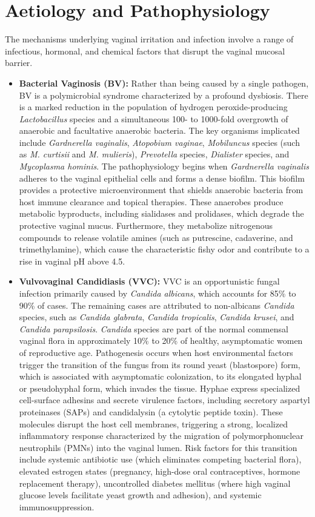\section*{Aetiology and Pathophysiology}
The mechanisms underlying vaginal irritation and infection involve a range of infectious, hormonal, and chemical factors that disrupt the vaginal mucosal barrier.
\begin{itemize}
    \item \textbf{Bacterial Vaginosis (BV):} Rather than being caused by a single pathogen, BV is a polymicrobial syndrome characterized by a profound dysbiosis. There is a marked reduction in the population of hydrogen peroxide-producing \textit{Lactobacillus} species and a simultaneous 100- to 1000-fold overgrowth of anaerobic and facultative anaerobic bacteria. The key organisms implicated include \textit{Gardnerella vaginalis}, \textit{Atopobium vaginae}, \textit{Mobiluncus} species (such as \textit{M. curtisii} and \textit{M. mulieris}), \textit{Prevotella} species, \textit{Dialister} species, and \textit{Mycoplasma hominis}. The pathophysiology begins when \textit{Gardnerella vaginalis} adheres to the vaginal epithelial cells and forms a dense biofilm. This biofilm provides a protective microenvironment that shields anaerobic bacteria from host immune clearance and topical therapies. These anaerobes produce metabolic byproducts, including sialidases and prolidases, which degrade the protective vaginal mucus. Furthermore, they metabolize nitrogenous compounds to release volatile amines (such as putrescine, cadaverine, and trimethylamine), which cause the characteristic fishy odor and contribute to a rise in vaginal pH above 4.5.
    \item \textbf{Vulvovaginal Candidiasis (VVC):} VVC is an opportunistic fungal infection primarily caused by \textit{Candida albicans}, which accounts for 85\% to 90\% of cases. The remaining cases are attributed to non-albicans \textit{Candida} species, such as \textit{Candida glabrata}, \textit{Candida tropicalis}, \textit{Candida krusei}, and \textit{Candida parapsilosis}. \textit{Candida} species are part of the normal commensal vaginal flora in approximately 10\% to 20\% of healthy, asymptomatic women of reproductive age. Pathogenesis occurs when host environmental factors trigger the transition of the fungus from its round yeast (blastospore) form, which is associated with asymptomatic colonization, to its elongated hyphal or pseudohyphal form, which invades the tissue. Hyphae express specialized cell-surface adhesins and secrete virulence factors, including secretory aspartyl proteinases (SAPs) and candidalysin (a cytolytic peptide toxin). These molecules disrupt the host cell membranes, triggering a strong, localized inflammatory response characterized by the migration of polymorphonuclear neutrophils (PMNs) into the vaginal lumen. Risk factors for this transition include systemic antibiotic use (which eliminates competing bacterial flora), elevated estrogen states (pregnancy, high-dose oral contraceptives, hormone replacement therapy), uncontrolled diabetes mellitus (where high vaginal glucose levels facilitate yeast growth and adhesion), and systemic immunosuppression.

\end{itemize}
